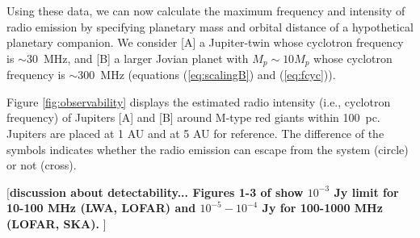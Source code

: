 \documentclass{emulateapj}
\def\memoYF#1{\color{red}$[${\bf #1}$]$ \color{black}}
\begin{document}
Using these data, we can now calculate the maximum frequency and intensity of radio emission by specifying planetary mass and orbital distance of a hypothetical planetary companion. 
We consider [A] a Jupiter-twin whose cyclotron frequency is $\sim 30$~MHz, and [B] a larger Jovian planet with $M_p\sim 10M_p$ whose cyclotron frequency is $\sim 300$~MHz (equations (\ref{eq:scalingB}) and (\ref{eq:fcyc})). 

Figure \ref{fig:observability} displays the estimated radio intensity (i.e., cyclotron frequency) of Jupiters [A] and [B] around M-type red giants within 100~pc. 
Jupiters are placed at 1 AU and at 5 AU for reference. 
The difference of the symbols indicates whether the radio emission can escape from the system (circle) or not (cross). 


\memoYF{discussion about detectability... Figures 1-3 of \citet{griesmeier2007b} show $10^{-3}$ Jy limit for 10-100 MHz (LWA, LOFAR) and $10^{-5}-10^{-4}$ Jy for 100-1000 MHz (LOFAR, SKA). }
\end{document}
